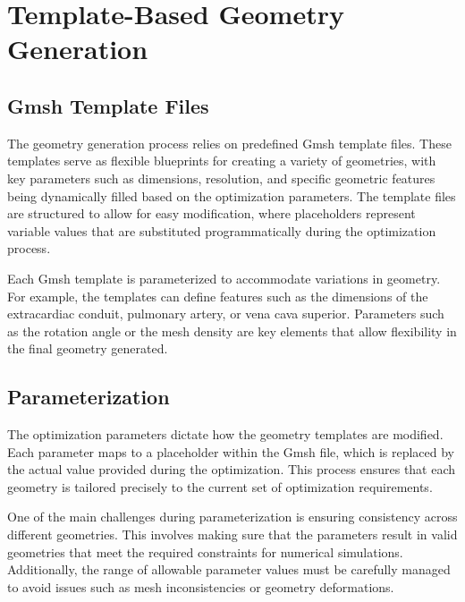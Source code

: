 \section{Template-Based Geometry Generation}


\subsection{Gmsh Template Files}

The geometry generation process relies on predefined Gmsh template files. These templates serve as flexible blueprints for creating a variety of geometries, with key parameters such as dimensions, resolution, and specific geometric features being dynamically filled based on the optimization parameters. The template files are structured to allow for easy modification, where placeholders represent variable values that are substituted programmatically during the optimization process.


Each Gmsh template is parameterized to accommodate variations in geometry. For example, the templates can define features such as the dimensions of the extracardiac conduit, pulmonary artery, or vena cava superior. Parameters such as the rotation angle or the mesh density are key elements that allow flexibility in the final geometry generated.

\subsection{Parameterization}

The optimization parameters dictate how the geometry templates are modified. Each parameter maps to a placeholder within the Gmsh file, which is replaced by the actual value provided during the optimization. This process ensures that each geometry is tailored precisely to the current set of optimization requirements.

One of the main challenges during parameterization is ensuring consistency across different geometries. This involves making sure that the parameters result in valid geometries that meet the required constraints for numerical simulations. Additionally, the range of allowable parameter values must be carefully managed to avoid issues such as mesh inconsistencies or geometry deformations.

